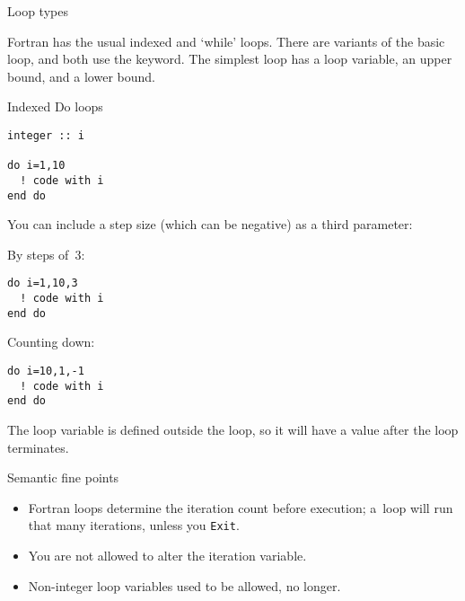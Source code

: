 
 {Loop types}

Fortran has the usual indexed and `while' loops. There are variants of the
basic loop, and both use the  keyword. The simplest loop has
a loop variable, an upper bound, and a lower bound.

\begin{block}{Indexed Do loops}
  \label{sl:doloop}
\begin{lstlisting}
integer :: i

do i=1,10
  ! code with i
end do
\end{lstlisting}

You can include a step size (which can be negative) as a third parameter:
\begin{multicols}{2}
By steps of~3:
\begin{lstlisting}
do i=1,10,3
  ! code with i
end do
\end{lstlisting}
\columnbreak
Counting down:
\begin{lstlisting}
do i=10,1,-1
  ! code with i
end do
\end{lstlisting}
\end{multicols}
\end{block}

The loop variable is defined outside the loop, so it will have a value
after the loop terminates.


\begin{block}{Semantic fine points}
  \label{sl:floop-semantics}
  \begin{itemize}
  \item Fortran loops determine the iteration count before execution;
    a~loop will run that many iterations, unless you \lstinline{Exit}.
  \item You are not allowed to alter the iteration variable.
  \item Non-integer loop variables used to be allowed, no longer.
  \end{itemize}
\end{block}

